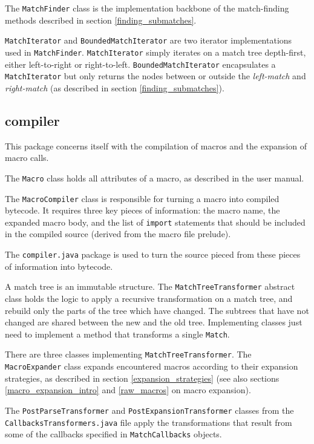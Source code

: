 The \texttt{MatchFinder} class is the implementation backbone of the
match-finding methods described in section \ref{finding_submatches}.

\texttt{MatchIterator} and \texttt{BoundedMatchIterator} are two iterator
implementations used in \texttt{MatchFinder}. \texttt{MatchIterator} simply
iterates on a match tree depth-first, either left-to-right or
right-to-left. \texttt{BoundedMatchIterator} encapsulates a
\texttt{MatchIterator} but only returns the nodes between or outside the
\emph{left-match} and \emph{right-match} (as described in section
\ref{finding_submatches}).

\subsection{compiler}
\label{compiler_tour}

This package concerns itself with the compilation of macros and the expansion of
macro calls.

The \texttt{Macro} class holds all attributes of a macro, as described in the
user manual.

The \texttt{MacroCompiler} class is responsible for turning a macro into
compiled bytecode. It requires three key pieces of information: the macro name,
the expanded macro body, and the list of \texttt{import} statements that should
be included in the compiled source (derived from the macro file prelude).

The \texttt{compiler.java} package is used to turn the source pieced from these
pieces of information into bytecode.

A match tree is an immutable structure. The \texttt{MatchTreeTransformer}
abstract class holds the logic to apply a recursive transformation on a match
tree, and rebuild only the parts of the tree which have changed. The subtrees
that have not changed are shared between the new and the old tree. Implementing
classes just need to implement a method that transforms a single \texttt{Match}.

There are three classes implementing \texttt{MatchTreeTransformer}. The
\texttt{MacroExpander} class expands encountered macros according to their
expansion strategies, as described in section \ref{expansion_strategies} (see
also sections \ref{macro_expansion_intro} and \ref{raw_macros} on macro
expansion).

The \texttt{PostParseTransformer} and \texttt{PostExpansionTransformer} classes
from the \texttt{CallbacksTransformers.java} file apply the transformations that
result from some of the callbacks specified in \texttt{MatchCallbacks} objects.

